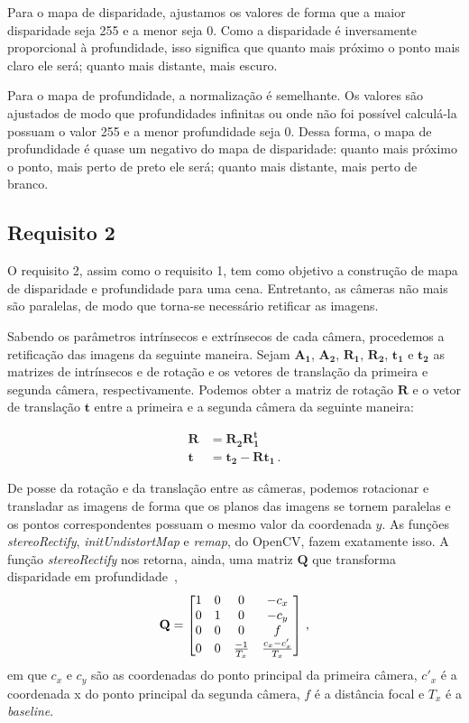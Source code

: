 \documentclass{bmvc2k}
\begin{document}
Para o mapa de disparidade, ajustamos os valores de forma que a maior disparidade seja 255 e a menor seja 0. Como a disparidade é inversamente proporcional à profundidade, isso significa que quanto mais próximo o ponto mais claro ele será; quanto mais distante, mais escuro.

Para o mapa de profundidade, a normalização é semelhante. Os valores são ajustados de modo que profundidades infinitas ou onde não foi possível calculá-la possuam o valor 255 e a menor profundidade seja 0. Dessa forma, o mapa de profundidade é quase um negativo do mapa de disparidade: quanto mais próximo o ponto, mais perto de preto ele será; quanto mais distante, mais perto de branco.

\subsection{Requisito 2}
O requisito 2, assim como o requisito 1, tem como objetivo a construção de mapa de disparidade e profundidade para uma cena. Entretanto, as câmeras não mais são paralelas, de modo que torna-se necessário retificar as imagens.

Sabendo os parâmetros intrínsecos e extrínsecos de cada câmera, procedemos a retificação das imagens da seguinte maneira. Sejam 
$\mathbf{A_1}$, $\mathbf{A_2}$, $\mathbf{R_1}$, $\mathbf{R_2}$, $\bm{t_1}$ e $\bm{t_2}$ as matrizes de intrínsecos e de rotação e os vetores de translação da primeira e segunda câmera, respectivamente. Podemos obter a matriz de rotação $\mathbf{R}$ e o vetor de translação $\bm{t}$ entre a primeira e a segunda câmera da seguinte maneira:

\begin{subequations}
    \begin{align}
    \mathbf{R}&=\mathbf{R_2}\mathbf{R_1^t}\\
    \bm{t}&=\bm{t_2}-\mathbf{R}\bm{t_1}\,.
    \end{align}
\end{subequations}

De posse da rotação e da translação entre as câmeras, podemos rotacionar e transladar as imagens de forma que os planos das imagens se tornem paralelas e os pontos correspondentes possuam o mesmo valor da coordenada $y$. As funções \textit{stereoRectify}, \textit{initUndistortMap} e \textit{remap}, do OpenCV, fazem exatamente isso. A função \textit{stereoRectify} nos retorna, ainda, uma matriz $\mathbf{Q}$ que transforma disparidade em profundidade~\cite{Bradski:2013:LOC:2523356},
\begin{equation}
    \centering
    \mathbf{Q} = \begin{bmatrix}
    1 & 0 & 0 & -c_x  \\
    0 & 1 & 0 & -c_y  \\
    0 & 0 & 0 & f \\
    0 & 0 & \frac{-1}{T_x} & \frac{c_x - c'_x}{T_x}
    \end{bmatrix}\,,
\end{equation}
em que $c_x$ e $c_y$ são as coordenadas do ponto principal da primeira câmera, $c'_x$ é a coordenada x do ponto principal da segunda câmera, $f$ é a distância focal e $T_x$ é a \textit{baseline}.
\end{document}
